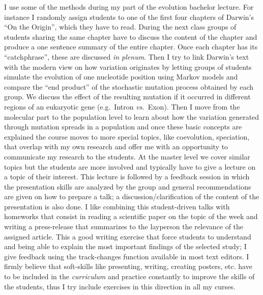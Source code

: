 \documentclass[a4paper,11pt]{article}
\begin{document}
I use some of the methods during my part of the evolution bachelor lecture. For instance I randomly assign students to one of the first four chapters of Darwin's ``On the Origin'', which they have to read. During the next class groups of students sharing the same chapter have to discuss the content of the chapter and produce a one sentence summary of the entire chapter. Once each chapter has its ``catchphrase'', these are discussed \emph{in plenum}. Then I try to link Darwin's text with the modern view on how variation originates by letting groups of students simulate the evolution of one nucleotide position using Markov models and compare the ``end product'' of the stochastic mutation process obtained by each group. We discuss the effect of the resulting mutation if it occurred in different regions of an eukaryotic gene (e.g.~Intron \emph{vs.}~Exon). Then I move from the molecular part to the population level to learn about how the variation generated through mutation spreads in a population and once these basic concepts are explained the course moves to more special topics, like coevolution, speciation, that overlap with my own research and offer me with an opportunity to communicate my research to the students. At the master level we cover similar topics but the students are more involved and typically have to give a lecture on a topic of their interest. This lecture is followed by a feedback session in which the presentation skills are analyzed by the group and general recommendations are given on how to prepare a talk; a discussion/clarification of the content of the presentation is also done. I like combining this student-driven talks with homeworks that consist in reading a scientific paper on the topic of the week and writing a press-release that summarizes to the layperson the relevance of the assigned article. This a good writing exercise that force students to understand and being able to explain the most important findings of the selected study; I give feedback using the track-changes function available in most text editors. I firmly believe that soft-skills like presenting, writing, creating posters, etc. have to be included in the \emph{curriculum} and practice constantly to improve the skills of the students, thus I try include exercises in this direction in all my curses.\\
\end{document}
